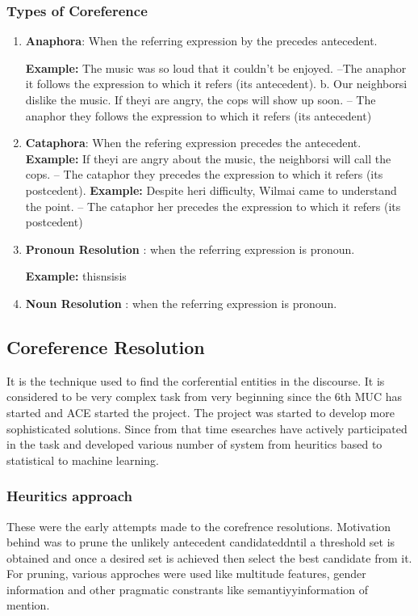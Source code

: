 \documentclass[11pt]{article}
\begin{document}
\subsubsection{Types of Coreference}

\begin{enumerate}
\item \textbf{Anaphora}: When the referring expression by the precedes antecedent.

\textbf{Example:} The music was so loud that it couldn't be enjoyed. –The anaphor it follows the expression to which it refers (its antecedent).
b. Our neighborsi dislike the music. If theyi are angry, the cops will show up soon. – The anaphor they follows the expression to which it refers (its antecedent)


\item \textbf{Cataphora}: When the refering expression precedes the antecedent.
\textbf{Example:}  If theyi are angry about the music, the neighborsi will call the cops. – The cataphor they precedes the expression to which it refers (its postcedent).
\textbf{Example:}  Despite heri difficulty, Wilmai came to understand the point. – The cataphor her precedes the expression to which it refers (its postcedent)

\item \textbf{Pronoun Resolution} : when the referring expression is pronoun.

\textbf{Example:} thisnsisis

\item \textbf{Noun Resolution} : when the referring expression is pronoun.

\end {enumerate}
\subsection{Coreference Resolution}
It is the technique used to find the corferential entities in the discourse. It is considered to be very complex task from very beginning since the 6th MUC has started and ACE started the project. The project was started to develop more sophisticated solutions. Since from that time esearches have actively participated in the task and developed various number of system from heuritics based to statistical to machine learning.


\subsubsection{Heuritics approach}
These were the early attempts made to the corefrence resolutions. Motivation behind was to prune the unlikely antecedent candidateddntil a threshold set is obtained and once a desired set is achieved then select the best candidate from it. For pruning, various approches were used like multitude features, gender information and other pragmatic constrants like semantiyyinformation of mention.
\end{document}
